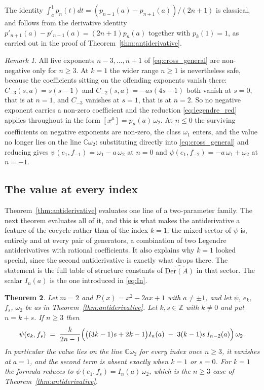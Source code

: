 \documentclass[11pt]{amsart}
\newtheorem{theorem}{Theorem}[section]
\theoremstyle{definition}
\theoremstyle{remark}
\newtheorem{remark}[theorem]{Remark}
\newcommand{\C}{\mathbb{C}}
\newcommand{\Z}{\mathbb{Z}}
\newcommand{\Der}{\mathrm{Der}}
\newcommand{\hDer}{\widehat{\Der(A)}}
\begin{document}
The identity $\int_a^1 p_n(t)dt = (p_{n-1}(a)-p_{n+1}(a))/(2n+1)$
is classical, and follows from the derivative identity
$p'_{n+1}(a)-p'_{n-1}(a) = (2n+1)p_n(a)$ together with $p_k(1)=1$, as
carried out in the proof of Theorem~\ref{thm:antiderivative}.

\begin{remark}\label{rem:antideriv_boundary}
All five exponents $n-3,\dots,n+1$ of \eqref{eq:cross_general} are
non-negative only for $n\geq3$. At $k=1$ the wider range $n\geq1$ is
nevertheless safe, because the coefficients sitting on the offending exponents
vanish there: $C_{-3}(s,a)=s(s-1)$ and $C_{-2}(s,a)=-as(4s-1)$ both vanish at
$s=0$, that is at $n=1$, and $C_{-3}$ vanishes at $s=1$, that is at $n=2$. So no
negative exponent carries a non-zero coefficient and the reduction
\eqref{eq:legendre_red} applies throughout in the form
$[x^\mu]=p_\mu(a)\,\omega_2$. At $n\leq0$ the surviving coefficients on negative
exponents are non-zero, the class $\omega_1$ enters, and the value no longer
lies on the line $\C\omega_2$: substituting directly into
\eqref{eq:cross_general} and reducing gives
$\psi(e_1,f_{-1})=\omega_1-a\,\omega_2$ at $n=0$ and
$\psi(e_1,f_{-2})=-a\,\omega_1+\omega_2$ at $n=-1$.
\end{remark}

\subsection{The value at every index}

Theorem~\ref{thm:antiderivative} evaluates one line of a two-parameter family.
The next theorem evaluates all of it, and this is what makes the antiderivative
a feature of the cocycle rather than of the index $k=1$: the mixed sector of
$\psi$ is, entirely and at every pair of generators, a combination of two
Legendre antiderivatives with rational coefficients. It also explains why
$k=1$ looked special, since the second antiderivative is exactly what drops
there. The statement is the full table of structure constants of $\hDer$ in
that sector. The scalar $I_n(a)$ is the one introduced in
\eqref{eq:In}.

\begin{theorem}\label{thm:cross_closed}
Let $m=2$ and $P(x)=x^2-2ax+1$ with $a\neq\pm1$, and let $\psi$, $e_k$, $f_s$,
$\omega_2$ be as in Theorem~\ref{thm:antiderivative}. Let $k,s\in\Z$ with
$k\neq0$ and put $n=k+s$. If $n\geq3$ then
\begin{equation}\label{eq:cross_closed}
  \psi(e_k,f_s)
  \;=\;
  \frac{k}{2n-1}\Bigl(\bigl((3k-1)s+2k-1\bigr)I_n(a)
      \;-\;3(k-1)s\,I_{n-2}(a)\Bigr)\,\omega_2 .
\end{equation}
In particular the value lies on the line $\C\omega_2$ for every index once
$n\geq3$, it vanishes at $a=1$, and the second term is absent exactly when
$k=1$ or $s=0$. For $k=1$ the formula reduces to
$\psi(e_1,f_s)=I_n(a)\,\omega_2$, which is the $n\geq3$ case of
Theorem~\ref{thm:antiderivative}.
\end{theorem}
\end{document}
